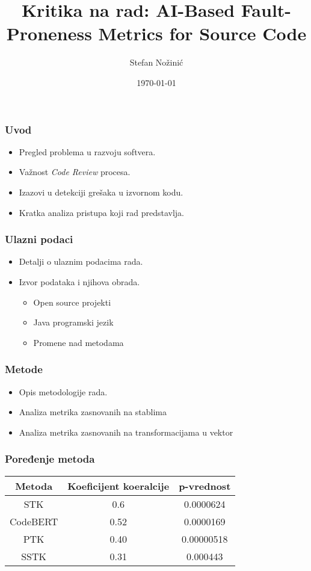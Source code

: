 \documentclass{beamer}
\title[Kritika: AI-Based Fault-Proneness Metrics]{Kritika na rad: AI-Based Fault-Proneness Metrics for Source Code}
\institute{Univerzitet u Novom Sadu}
\author{Stefan Nožinić}
\date{\today}
\begin{document}
\begin{frame}
  \titlepage
\end{frame}

\begin{frame}
\frametitle{Uvod}
\begin{itemize}
    \item Pregled problema u razvoju softvera.
    \item Važnost \textit{Code Review} procesa.
    \item Izazovi u detekciji grešaka u izvornom kodu.
    \item Kratka analiza pristupa koji rad predstavlja.
\end{itemize}
\end{frame}

\begin{frame}
\frametitle{Ulazni podaci}
\begin{itemize}
    \item Detalji o ulaznim podacima rada.
    \item Izvor podataka i njihova obrada.
    \begin{itemize}
        \item Open source projekti 
        \item Java programski jezik
        \item Promene nad metodama
    \end{itemize}
\end{itemize}
\end{frame}

\begin{frame}
\frametitle{Metode}
\begin{itemize}
    \item Opis metodologije rada.
    \item Analiza metrika zasnovanih na stablima 
    \item Analiza metrika zasnovanih na transformacijama u vektor
\end{itemize}
\end{frame}

\begin{frame}
    \frametitle{Poređenje metoda}
    \begin{table}[ht]
    \centering
    \begin{tabular}{|c|c|c|}
    \hline
    Metoda & Koeficijent koeralcije & p-vrednost \\
    \hline
    STK        & 0.6 &0.0000624 \\
    CodeBERT   & 0.52&0.0000169 \\
    PTK        & 0.40    & 0.00000518         \\
    SSTK   &   0.31  & 0.000443         \\
    \hline
    \end{tabular}
    \end{table}
\end{frame}
    
\end{document}
